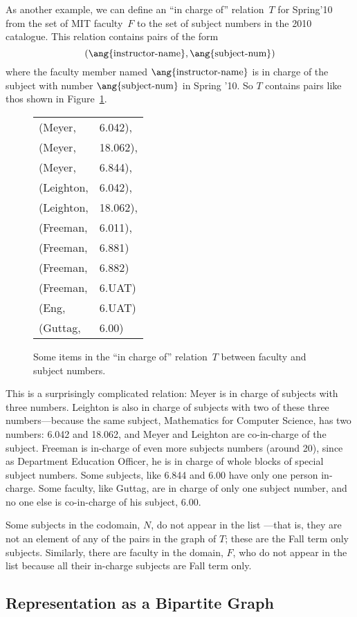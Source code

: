 As another example, we can define an ``in charge of'' relation~$T$ for
Spring'10 from the set of MIT faculty~$F$ to the set of subject
numbers in the 2010 catalogue.  This relation contains pairs of the
form
\[
    (\ang{\text{instructor-name}}, \ang{\text{subject-num}})
\]
where the faculty member named $\ang{\text{instructor-name}}$ is in
charge of the subject with number $\ang{\text{subject-num}}$ in Spring
'10.  So $T$ contains pairs like thos shown in Figure~\ref{fig:FA}.

\begin{figure}

\begin{tabular}{ll}
(Meyer,    & 6.042),\\
(Meyer,    & 18.062),\\
(Meyer,    & 6.844),\\
(Leighton, & 6.042),\\
(Leighton, & 18.062),\\
(Freeman,  & 6.011),\\
(Freeman,  & 6.881)\\
(Freeman,  & 6.882)\\
(Freeman,  & 6.UAT)\\
(Eng,      & 6.UAT)\\
(Guttag,   & 6.00)
\end{tabular}

\caption{Some items in the ``in charge of'' relation~$T$ between
  faculty and subject numbers.}

\label{fig:FA}

\end{figure}

This is a surprisingly complicated relation: Meyer is in charge of
subjects with three numbers.  Leighton is also in charge of subjects
with two of these three numbers---because the same subject,
Mathematics for Computer Science, has two numbers: 6.042 and 18.062,
and Meyer and Leighton are co-in-charge of the subject.  Freeman is
in-charge of even more subjects numbers (around 20), since as
Department Education Officer, he is in charge of whole blocks of
special subject numbers.  Some subjects, like 6.844 and 6.00 have only
one person in-charge.  Some faculty, like Guttag, are in charge of
only one subject number, and no one else is co-in-charge of his
subject, 6.00.

Some subjects in the codomain, $N$, do not appear in the list ---that
is, they are not an element of any of the pairs in the graph of $T$;
these are the Fall term only subjects.  Similarly, there are faculty
in the domain, $F$, who do not appear in the list because all their
in-charge subjects are Fall term only.

\subsection{Representation as a Bipartite Graph}



\endinput
